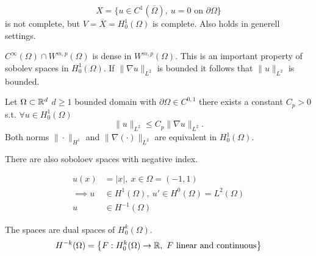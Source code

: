 \begin{example}
	\begin{equation*}
	X= \big \{ u \in C^1(\overline{\Omega}), \ u=0 \text{ on } \partial\Omega  \big \}
	\end{equation*}
	is not complete, but $V = \overline{X} = H^1_0(\Omega)$ is complete. Also holds in  generell settings.
\end{example}

\par
 $C^\infty(\Omega)\cap W^{m,p}(\Omega)$ is dense in $ W^{m,p}(\Omega)$.
This is an important property of sobolev spaces in $H^1_0(\Omega)$. \enter
If $\|\nabla u \|_{L^2}$ is bounded it follows that $\|u \|_{L^2}$ is bounded.

\begin{theorem}
	Let $\Omega \subset \mathbb{R}^d$ $d\geq 1$ bounded domain with $\partial \Omega \in C^{0,1}$ there exists a constant $C_p > 0$ s.t. $\forall u\in H^1_0(\Omega)$
	\begin{equation*}
		\|u\|_{L^2} \leq C_p \|\nabla u\|_{L^2}.
	\end{equation*}
	Both norms $\|\cdot\|_{H^1}$ and $ \|\nabla(\cdot)\|_{L^2} $ are equivalent in $H^1_0(\Omega)$.
\end{theorem}
 
There are also soboloev spaces with negative index.

\begin{example}
	\begin{align*}
	u(x) &= |x|, \ x\in \Omega = (-1,1)\\
	\implies u&\in H^1(\Omega),\ u' \in H^0(\Omega) = L^2(\Omega)\\
	u &\in H^{-1}(\Omega)
	\end{align*}
\end{example}


The spaces are dual spaces of $H^k_0(\Omega)$.
\begin{equation*}
	H^{-k}(\Omega) = \big \{ F: H^k_0(\Omega) \to \mathbb{R},\  F \text{ linear and continuous} \big \}
\end{equation*}


